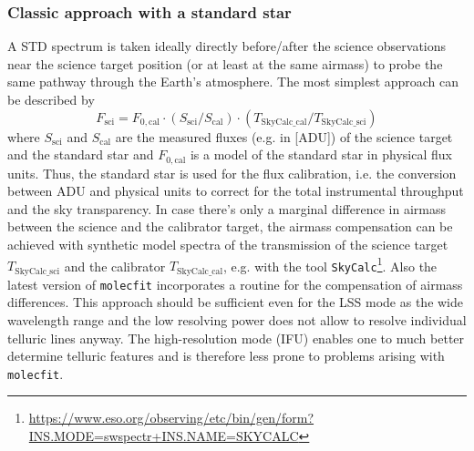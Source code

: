 \subsubsection{Classic approach with a standard star}\label{sssec:tecllcorrclassic}
A \ac{STD} spectrum is taken ideally directly before/after the science observations near the science target position (or at least at the same airmass) to probe the same pathway through the Earth's atmosphere. The most simplest approach can be described by
\begin{equation}
    F_\textrm{sci}=F_{0,\textrm{cal}}\cdot\left(S_\textrm{sci}/S_\textrm{cal}\right)\cdot\left(T_\textrm{SkyCalc\_cal} / T_\textrm{SkyCalc\_sci}\right)
\end{equation}
where $S_\textrm{sci}$ and $S_\textrm{cal}$ are the measured fluxes (e.g. in [\ac{ADU}]) of the science target and the standard star and $F_{0,\textrm{cal}}$ is a model of the standard star in physical flux units. Thus, the standard star is used for the flux calibration, i.e. the conversion between \ac{ADU} and physical units to correct for the total instrumental throughput and the sky transparency. In case there's only a marginal difference in airmass between the science and the calibrator target, the airmass compensation can be achieved with synthetic model spectra of the transmission of the science target $T_\textrm{SkyCalc\_sci}$ and the calibrator $T_\textrm{SkyCalc\_cal}$, e.g. with the tool \texttt{SkyCalc}\footnote{\url{https://www.eso.org/observing/etc/bin/gen/form?INS.MODE=swspectr+INS.NAME=SKYCALC}}. Also the latest version of \texttt{molecfit} incorporates a routine for the compensation of airmass differences. This approach should be sufficient even for the \ac{LSS} mode as the wide wavelength range and the low resolving power does not allow to resolve individual telluric lines anyway. The high-resolution mode (\ac{IFU}) enables one to much better determine telluric features and is therefore less prone to problems arising with \texttt{molecfit}.\\
